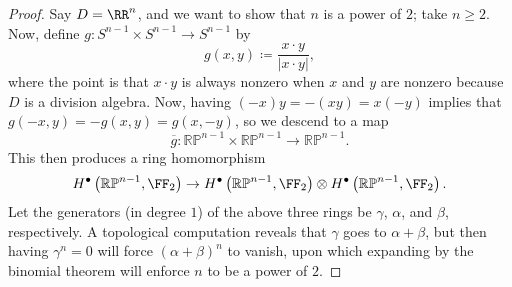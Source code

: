 \documentclass[../notes.tex]{subfiles}
\begin{document}
\begin{proof}
	Say $D=\RR^n$, and we want to show that $n$ is a power of $2$; take $n\ge2$. Now, define $g\colon S^{n-1}\times S^{n-1}\to S^{n-1}$ by
	\[g(x,y)\coloneqq\frac{x\cdot y}{\left|x\cdot y\right|},\]
	where the point is that $x\cdot y$ is always nonzero when $x$ and $y$ are nonzero because $D$ is a division algebra. Now, having $(-x)y=-(xy)=x(-y)$ implies that $g(-x,y)=-g(x,y)=g(x,-y)$, so we descend to a map
	\[\overline g\colon\mathbb{RP}^{n-1}\times\mathbb{RP}^{n-1}\to\mathbb{RP}^{n-1}.\]
	This then produces a ring homomorphism
	\[H^\bullet\left(\mathbb{RP}^{n-1},\FF_2\right)\to H^\bullet\left(\mathbb{RP}^{n-1},\FF_2\right)\otimes H^\bullet\left(\mathbb{RP}^{n-1},\FF_2\right).\]
	Let the generators (in degree $1$) of the above three rings be $\gamma$, $\alpha$, and $\beta$, respectively. A topological computation reveals that $\gamma$ goes to $\alpha+\beta$, but then having $\gamma^n=0$ will force $(\alpha+\beta)^n$ to vanish, upon which expanding by the binomial theorem will enforce $n$ to be a power of $2$.
\end{proof}
\end{document}
